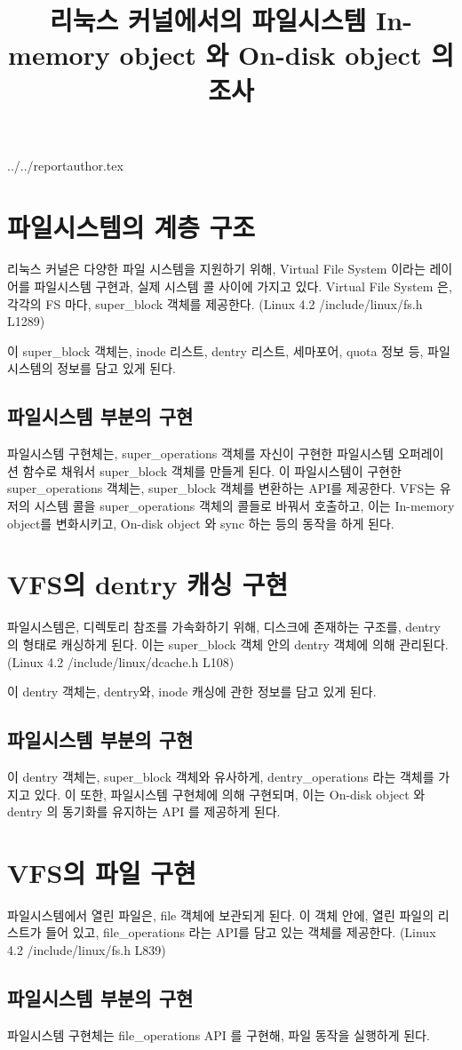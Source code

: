 \documentclass {article}
\begin{document}
\title {리눅스 커널에서의 파일시스템 In-memory object 와 On-disk object 의 조사}
 {../../reportauthor.tex}
\maketitle

\section{파일시스템의 계층 구조}
리눅스 커널은 다양한 파일 시스템을 지원하기 위해, Virtual File System 이라는 레이어를 파일시스템 구현과, 실제 시스템 콜 사이에 가지고 있다. Virtual File System 은, 각각의 FS 마다, super\_block 객체를 제공한다. (Linux 4.2 /include/linux/fs.h L1289)

이 super\_block 객체는, inode 리스트, dentry 리스트, 세마포어, quota 정보 등, 파일시스템의 정보를 담고 있게 된다.

\subsection{파일시스템 부분의 구현}
파일시스템 구현체는, super\_operations 객체를 자신이 구현한 파일시스템 오퍼레이션 함수로 채워서 super\_block 객체를 만들게 된다. 이 파일시스템이 구현한 super\_operations 객체는, super\_block 객체를 변환하는 API를 제공한다. VFS는 유저의 시스템 콜을 super\_operations 객체의 콜들로 바꿔서 호출하고, 이는 In-memory object를 변화시키고, On-disk object 와 sync 하는 등의 동작을 하게 된다.

\section{VFS의 dentry 캐싱 구현}
파일시스템은, 디렉토리 참조를 가속화하기 위해, 디스크에 존재하는 구조를, dentry 의 형태로 캐싱하게 된다. 이는 super\_block 객체 안의 dentry 객체에 의해 관리된다.(Linux 4.2 /include/linux/dcache.h L108)

이 dentry 객체는, dentry와, inode 캐싱에 관한 정보를 담고 있게 된다.

\subsection{파일시스템 부분의 구현}
이 dentry 객체는, super\_block 객체와 유사하게, dentry\_operations 라는 객체를 가지고 있다. 이 또한, 파일시스템 구현체에 의해 구현되며, 이는 On-disk object 와 dentry 의 동기화를 유지하는 API 를 제공하게 된다.

\section{VFS의 파일 구현}
파일시스템에서 열린 파일은, file 객체에 보관되게 된다. 이 객체 안에, 열린 파일의 리스트가 들어 있고, file\_operations 라는 API를 담고 있는 객체를 제공한다. (Linux 4.2 /include/linux/fs.h L839)

\subsection{파일시스템 부분의 구현}
파일시스템 구현체는 file\_operations API 를 구현해, 파일 동작을 실행하게 된다.
\end{document}
